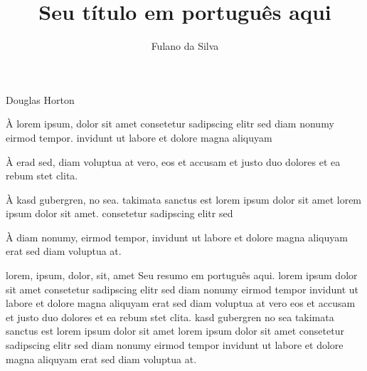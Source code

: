 \documentclass[portuguese,twoside]{pucrs-ppgcc}
\author{Fulano da Silva}
\title{Seu título em português aqui}
      {Your title in english here}
\begin{document}

         {Douglas Horton}


\begin{agradecimentos}
À lorem ipsum, dolor sit amet consetetur sadipscing elitr sed diam
nonumy eirmod tempor. invidunt ut labore et dolore magna aliquyam

À erad sed, diam voluptua at vero, eos et accusam et justo duo
dolores et ea rebum stet clita.

À kasd gubergren, no sea. takimata sanctus est lorem ipsum dolor sit
amet lorem ipsum dolor sit amet. consetetur sadipscing elitr sed

À diam nonumy, eirmod tempor, invidunt ut labore et dolore magna
aliquyam erat sed diam voluptua at.
\end{agradecimentos}

\begin{resumo}{lorem, ipsum, dolor, sit, amet}
Seu resumo em português aqui. lorem ipsum dolor sit amet
consetetur sadipscing elitr sed diam nonumy eirmod tempor invidunt
ut labore et dolore magna aliquyam erat sed diam voluptua at vero
eos et accusam et justo duo dolores et ea rebum stet clita.  kasd
gubergren no sea takimata sanctus est lorem ipsum dolor sit amet
lorem ipsum dolor sit amet consetetur sadipscing elitr sed diam
nonumy eirmod tempor invidunt ut labore et dolore magna aliquyam
erat sed diam voluptua at.
\end{resumo}
\end{document}
